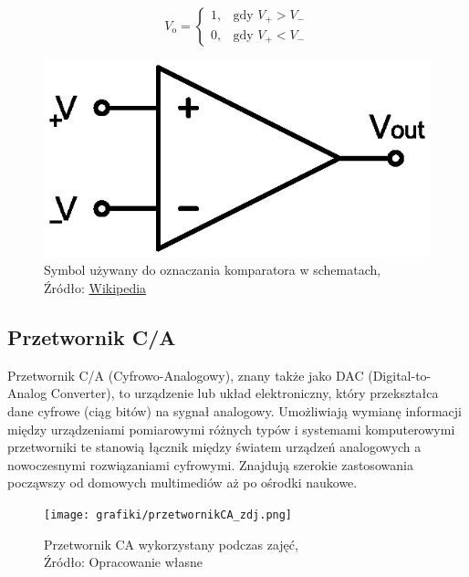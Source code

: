 \documentclass{article}
\begin{document}
      \begin{figure}[!ht]
        \begin{minipage}{.45\textwidth}
          \begin{equation}
            V_{\mathrm {o} }={\begin{cases}1,&{\mbox{gdy }}V_{+}>V_{-}\\0,&{\mbox{gdy }}V_{+}<V_{-}\end{cases}}
          \end{equation}
        \end{minipage}
        \begin{minipage}{.5\textwidth}
          \centering
          \includegraphics[scale=0.35]{grafiki/Comparator_symbol.eps}
          \caption{Symbol używany do oznaczania komparatora w schematach,
          \\Źródło: \href{https://upload.wikimedia.org/wikipedia/commons/1/1a/Comparator_symbol.svg}{Wikipedia}}
        \end{minipage}
      \end{figure}

    \subsection{Przetwornik C/A}
      Przetwornik C/A (Cyfrowo-Analogowy), znany także jako DAC (Digital-to-Analog Converter), to urządzenie lub układ elektroniczny, który przekształca dane cyfrowe (ciąg bitów) na sygnał analogowy. Umożliwiają wymianę informacji między
      urządzeniami pomiarowymi różnych typów i systemami komputerowymi przetworniki te stanowią łącznik między światem urządzeń analogowych a nowoczesnymi rozwiązaniami cyfrowymi. Znajdują szerokie zastosowania począwszy od domowych multimediów aż po ośrodki naukowe.
      \begin{figure}[!ht]
        \centering
        \texttt{[image: grafiki/przetwornikCA\_zdj.png]}
        \caption{Przetwornik CA wykorzystany podczas zajęć,
        \\Źródło: Opracowanie własne}
      \end{figure}
 
\end{document}
